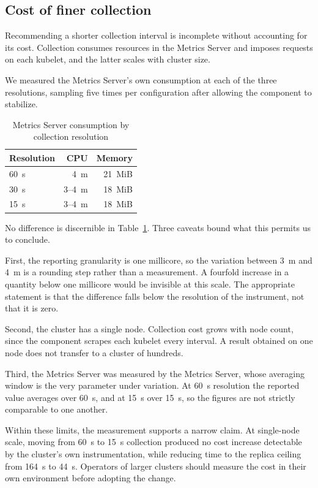 \documentclass[conference]{IEEEtran}
\begin{document}
\subsection{Cost of finer collection}

Recommending a shorter collection interval is incomplete without accounting for
its cost. Collection consumes resources in the Metrics Server and imposes
requests on each kubelet, and the latter scales with cluster size.

We measured the Metrics Server's own consumption at each of the three
resolutions, sampling five times per configuration after allowing the component
to stabilize.

\begin{table}[ht]
\caption{Metrics Server consumption by collection resolution}
\label{tab:custo}
\centering
\begin{tabular}{@{}lrr@{}}
\toprule
Resolution & CPU & Memory \\
\midrule
60~s & 4~m & 21~MiB \\
30~s & 3--4~m & 18~MiB \\
15~s & 3--4~m & 18~MiB \\
\bottomrule
\end{tabular}
\end{table}

No difference is discernible in Table~\ref{tab:custo}. Three caveats bound what
this permits us to conclude.

First, the reporting granularity is one millicore, so the variation between
3~m and 4~m is a rounding step rather than a measurement. A fourfold increase
in a quantity below one millicore would be invisible at this scale. The
appropriate statement is that the difference falls below the resolution of the
instrument, not that it is zero.

Second, the cluster has a single node. Collection cost grows with node count,
since the component scrapes each kubelet every interval. A result obtained on
one node does not transfer to a cluster of hundreds.

Third, the Metrics Server was measured by the Metrics Server, whose averaging
window is the very parameter under variation. At 60~s resolution the reported
value averages over 60~s, and at 15~s over 15~s, so the figures are not strictly
comparable to one another.

Within these limits, the measurement supports a narrow claim. At single-node
scale, moving from 60~s to 15~s collection produced no cost increase detectable
by the cluster's own instrumentation, while reducing time to the replica ceiling
from 164~s to 44~s. Operators of larger clusters should measure the cost in
their own environment before adopting the change.
\end{document}
